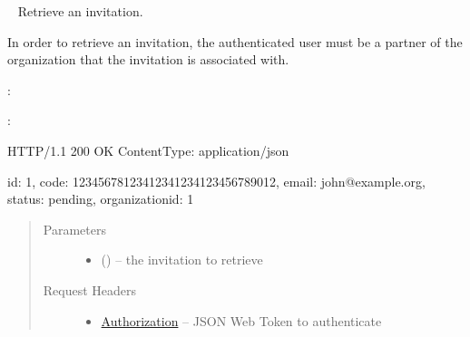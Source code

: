 \documentclass[letterpaper,10pt,english]{sphinxmanual}
\begin{document}
\begin{fulllineitems}
\label{\detokenize{resources/invitation:get--invitations-(invitation_id)}}~
Retrieve an invitation.

In order to retrieve an invitation, the authenticated user must be a
partner of the organization that the invitation is associated with.

:

\begin{sphinxVerbatim}[commandchars=\\\{\}]
  
 
 
\end{sphinxVerbatim}

:

\begin{sphinxVerbatim}[commandchars=\\\{\}]
HTTP/1.1 200 OK
Content\PYGZhy{}Type: application/json

\PYGZob{}
    \PYGZsq{}id\PYGZsq{}: 1,
    \PYGZsq{}code\PYGZsq{}: \PYGZsq{}12345678\PYGZhy{}1234\PYGZhy{}1234\PYGZhy{}1234\PYGZhy{}123456789012\PYGZsq{},
    \PYGZsq{}email\PYGZsq{}: \PYGZsq{}john@example.org\PYGZsq{},
    \PYGZsq{}status\PYGZsq{}: \PYGZsq{}pending\PYGZsq{},
    \PYGZsq{}organization\PYGZus{}id\PYGZsq{}: 1
\PYGZcb{}
\end{sphinxVerbatim}
\begin{quote}\begin{description}
\item[{Parameters}] \leavevmode\begin{itemize}
\item {} 
 () -- the invitation to retrieve

\end{itemize}

\item[{Request Headers}] \leavevmode\begin{itemize}
\item {} 
\href{http://tools.ietf.org/html/rfc7235\#section-4.2}{Authorization} -- JSON Web Token to authenticate

\end{itemize}


\end{description}
\end{quote}
\end{fulllineitems}
\end{document}
